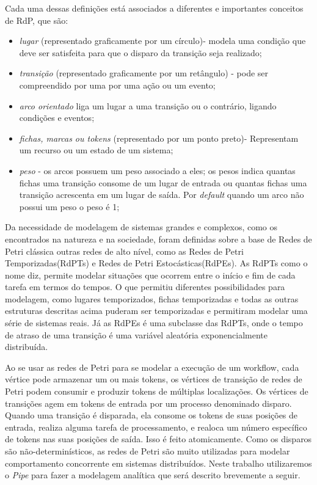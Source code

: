 		Cada uma dessas definições está associados a diferentes e importantes conceitos de RdP, que são:
		
			\begin{itemize}

				\item \textit{lugar} (representado graficamente por um círculo)- modela uma condição que deve ser satisfeita para que o disparo da transição seja realizado;

				\item \textit{transição} (representado graficamente por um retângulo) - pode ser compreendido por uma por uma ação ou um evento;

				\item \textit{arco orientado} liga um lugar a uma transição ou o contrário, ligando condições e eventos;

				\item \textit{fichas, marcas ou tokens} (representado por um ponto preto)- Representam um recurso ou um estado de um sistema;

				\item \textit{peso} - os arcos possuem um peso associado a eles; os pesos indica quantas fichas uma transição consome de um lugar de entrada ou quantas fichas uma transição acrescenta em um lugar de saída. Por \textit{default} quando um arco não possui um peso o peso é 1;
					
			\end{itemize}
			
			Da necessidade de modelagem de sistemas grandes e complexos, como os encontrados na natureza e na sociedade, foram definidas sobre a base de Redes de Petri clássica outras redes de alto nível, como as Redes de Petri Temporizadas(RdPTs) e Redes de Petri Estocásticas(RdPEs). As RdPTs como o nome diz, permite modelar situações que ocorrem entre o início e fim de cada tarefa em termos do tempos. O que permitiu diferentes possibilidades para modelagem, como lugares temporizados, fichas temporizadas e todas as outras estruturas descritas acima puderam ser temporizadas e permitiram modelar uma série de sistemas reais. Já as RdPEs é uma subclasse das RdPTs, onde o tempo de atraso de uma transição é uma variável aleatória exponencialmente distribuída\cite{Braghetto2011}. 
		
			Ao se usar as redes de Petri para se modelar a execução de um workflow, cada vértice pode armazenar um ou mais tokens, os vértices de transição de redes de Petri podem consumir e produzir tokens de múltiplas localizações. Os vértices de transições agem em tokens de entrada por um processo denominado disparo. Quando uma transição é disparada, ela consome os tokens de suas posições de entrada, realiza alguma tarefa de processamento, e realoca um número específico de tokens nas suas posições de saída. Isso é feito atomicamente. Como os disparos são não-determinísticos, as redes de Petri são muito utilizadas para modelar comportamento concorrente em sistemas distribuídos\cite{Ogasawara}. Neste trabalho utilizaremos o \textit{Pipe} para fazer a modelagem analítica que será descrito brevemente a seguir.
					
